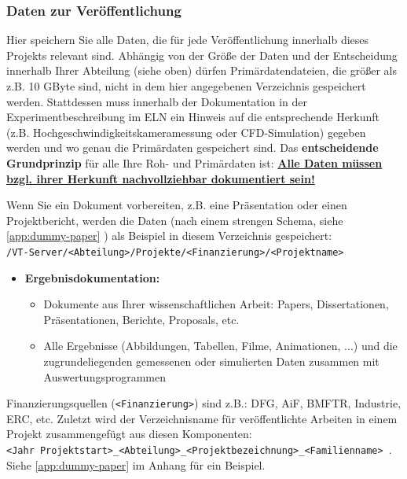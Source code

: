 \subsubsection{Daten zur Veröffentlichung}\label{ssc:data-for-publication}

Hier speichern Sie alle Daten, die für jede Veröffentlichung innerhalb dieses
Projekts relevant sind. Abhängig von der Größe der Daten und der Entscheidung
innerhalb Ihrer Abteilung (siehe oben) dürfen Primärdatendateien, die größer als
z.B. 10 GByte sind, nicht in dem hier angegebenen Verzeichnis gespeichert
werden. Stattdessen muss innerhalb der Dokumentation in der
Experimentbeschreibung im ELN ein Hinweis auf die entsprechende Herkunft (z.B.
Hochgeschwindigkeitskameramessung oder CFD-Simulation) gegeben werden und wo
genau die Primärdaten gespeichert sind. Das \textbf{entscheidende Grundprinzip}
für alle Ihre Roh- und Primärdaten ist: \textbf{\underline{Alle Daten müssen bzgl.
ihrer Herkunft nachvollziehbar dokumentiert sein!}}

Wenn Sie ein Dokument vorbereiten, z.B. eine Präsentation oder einen
Projektbericht, werden die Daten (nach einem strengen Schema, siehe \ref{app:dummy-paper} ) als Beispiel in diesem Verzeichnis gespeichert: \\
\texttt{/VT-Server/<Abteilung>/Projekte/<Finanzierung>/<Projektname>}
\begin{itemize}
  \item[$\rightarrow$] \textbf{Ergebnisdokumentation:}
    \begin{itemize}
      \item Dokumente aus Ihrer wissenschaftlichen Arbeit: Papers,
            Dissertationen, Präsentationen, Berichte, Proposals, etc.
      \item Alle Ergebnisse (Abbildungen, Tabellen, Filme, Animationen, ...)
            und die zugrundeliegenden gemessenen oder simulierten Daten
            zusammen mit Auswertungsprogrammen
    \end{itemize}
\end{itemize}
Finanzierungsquellen (\texttt{<Finanzierung>}) sind z.B.: DFG, AiF, BMFTR, Industrie, ERC, etc. Zuletzt wird der Verzeichnisname für veröffentlichte Arbeiten in einem Projekt zusammengefügt aus diesen Komponenten: \\
\texttt{<Jahr Projektstart>\_<Abteilung>\_<Projektbezeichnung>\_<Familienname> }.
Siehe \ref{app:dummy-paper} im Anhang für ein Beispiel.

